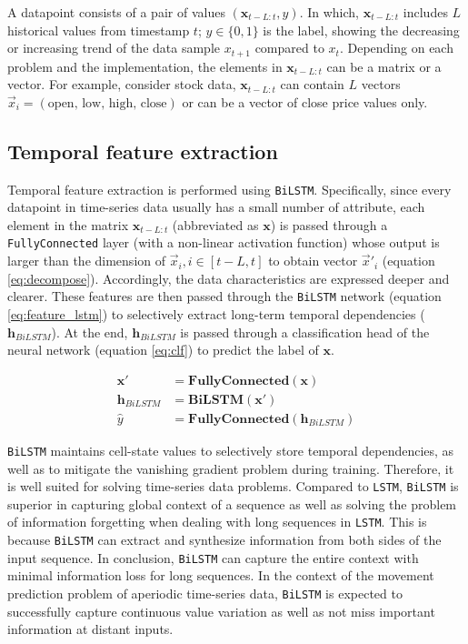 \documentclass[a4paper,fleqn]{cas-sc}
\begin{document}
A datapoint consists of a pair of values $(\mathbf{x}_{t-L:t}, y)$. In which, $\mathbf{x}_{t-L:t}$ includes $L$ historical values from timestamp $t$; $y\in \{0,1\}$ is the label, showing the decreasing or increasing trend of the data sample $x_{t+1}$ compared to $x_{t}$. Depending on each problem and the implementation, the elements in $\mathbf{x}_{t-L:t}$ can be a matrix or a vector. For example, consider stock data, $\mathbf{x}_{t-L:t}$ can contain $L$ vectors $\vec x_i = (\text{open, low, high, close})$ or can be a vector of close price values only.

\subsection{Temporal feature extraction}

Temporal feature extraction is performed using \verb|BiLSTM|. Specifically, since every datapoint in time-series data usually has a small number of attribute, each element in the matrix $\mathbf{x}_{t-L:t}$ (abbreviated as $\mathbf{x}$) is passed through a \verb|FullyConnected| layer (with a non-linear activation function) whose output is larger than the dimension of $\vec x_i, i\in[t-L, t]$ to obtain vector $\vec x'_i$ (equation \ref{eq:decompose}). Accordingly, the data characteristics are expressed deeper and clearer. These features are then passed through the \verb|BiLSTM| network (equation \ref{eq:feature_lstm}) to selectively extract long-term temporal dependencies ($\mathbf{h}_{BiLSTM}$). At the end, $\mathbf{h}_{BiLSTM}$ is passed through a classification head of the neural network (equation \ref{eq:clf}) to predict the label of $\mathbf{x}$.

\begin{align}
    \mathbf{x'} &= \mathbf{FullyConnected}\left( \mathbf{x} \right) \label{eq:decompose}\\
    \mathbf{h}_{BiLSTM} &= \mathbf{BiLSTM}\left( \mathbf{x'} \right) \label{eq:feature_lstm}\\
    \hat y &= \mathbf{FullyConnected}\left( \mathbf{h}_{BiLSTM} \right) \label{eq:clf}
\end{align}

\verb|BiLSTM| maintains cell-state values to selectively store temporal dependencies, as well as to mitigate the vanishing gradient problem during training. Therefore, it is well suited for solving time-series data problems. Compared to \verb|LSTM|, \verb|BiLSTM| is superior in capturing global context of a sequence as well as solving the problem of information forgetting when dealing with long sequences in \verb|LSTM|. This is because \verb|BiLSTM| can extract and synthesize information from both sides of the input sequence. In conclusion, \verb|BiLSTM| can capture the entire context with minimal information loss for long sequences. In the context of the movement prediction problem of aperiodic time-series data, \verb|BiLSTM| is expected to successfully capture continuous value variation as well as not miss important information at distant inputs.
\end{document}
